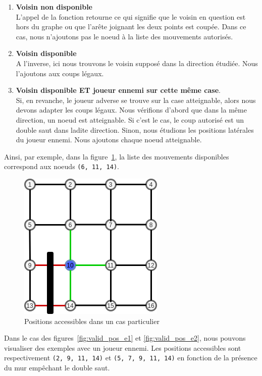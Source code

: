 \documentclass[a4paper]{article}
\begin{document}
\begin{enumerate}
    \item \textbf{Voisin non disponible} \\
L'appel de la fonction retourne  ce qui signifie que le voisin en question est hors du graphe ou que l'arête joignant les deux points est coupée. Dans ce cas, nous n'ajoutons pas le noeud à la liste des mouvements autorisés.
    \item \textbf{Voisin disponible} \\
A l'inverse, ici nous trouvons le voisin supposé dans la direction étudiée. Nous l'ajoutons aux coups légaux. 
    \item \textbf{Voisin disponible ET joueur ennemi sur cette même case}. \\
Si, en revanche, le joueur adverse se trouve sur la case atteignable, alors nous devons adapter les coups légaux. Nous vérifions d'abord que dans la même direction, un noeud est atteignable. Si c'est le cas, le coup autorisé est un double saut dans ladite direction. Sinon, nous étudions les positions latérales du joueur ennemi. Nous ajoutons chaque noeud atteignable. \\
\end{enumerate}

Ainsi, par exemple, dans la figure~\ref{fig:valid_pos1}, la liste des mouvements disponibles correspond aux noeuds \texttt{(6, 11, 14)}.

\begin{figure}[h!]
    \centering
    \includegraphics[scale=0.65]{valid_position1.png}
    \caption{Positions accessibles dans un cas particulier}
    \label{fig:valid_pos1}
\end{figure}

Dans le cas des figures~\ref{fig:valid_pos_e1} et \ref{fig:valid_pos_e2}, nous pouvons visualiser des exemples avec un joueur ennemi. Les positions accessibles sont respectivement \texttt{(2, 9, 11, 14)} et \texttt{(5, 7, 9, 11, 14)} en fonction de la présence du mur empêchant le double saut.
\end{document}
